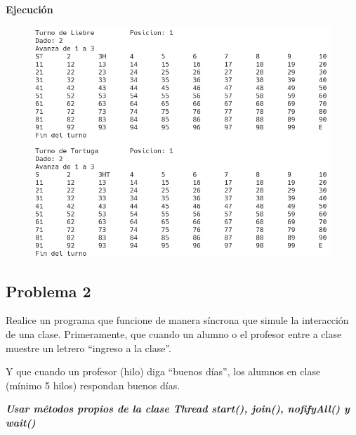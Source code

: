 \documentclass[11pt, twocolumn]{article}
\begin{document}
  \newpage
  \textbf{Ejecución}
  \begin{figure}[h!]
    \centering
    \includegraphics[width=\columnwidth]{12P1.png}
  \end{figure}

  \subsection*{Problema 2}
  Realice un programa que funcione de manera síncrona que simule la interacción de una clase. Primeramente, que cuando un alumno o el profesor entre a clase muestre un letrero ``ingreso a la clase''.

  Y que cuando un profesor (hilo) diga “buenos días”, los alumnos en clase (mínimo 5 hilos) respondan buenos días.

  \textit{\textbf{Usar métodos propios de la clase Thread start(), join(), nofifyAll() y wait()}}
\end{document}
